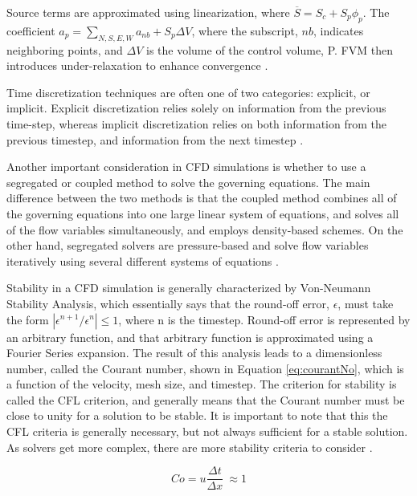\documentclass{UCF_ETD}
\begin{document}
Source terms are approximated using linearization, where $\overline{S}=S_c+S_p\phi_p$. The coefficient $a_p=\sum_{N,S,E,W}{a_{nb}+S_p\Delta V}$, where the subscript, $nb$, indicates neighboring points, and $\Delta V$ is the volume of the control volume, P. FVM then introduces under-relaxation to enhance convergence \cite{SIMPLEC}.

Time discretization techniques are often one of two categories: explicit, or implicit. Explicit discretization relies solely on information from the previous time-step, whereas implicit discretization relies on both information from the previous timestep, and information from the next timestep \cite{Anderson1995}.

Another important consideration in CFD simulations is whether to use a segregated or coupled method to solve the governing equations. The main difference between the two methods is that the coupled method combines all of the governing equations into one large linear system of equations, and solves all of the flow variables simultaneously, and employs density-based schemes. On the other hand, segregated solvers are pressure-based and solve flow variables iteratively using several different systems of equations \cite{ransom_1996}.

Stability in a CFD simulation is generally characterized by Von-Neumann Stability Analysis, which essentially says that the round-off error, $\epsilon$, must take the form $|\epsilon^{n+1} / \epsilon^{n}| \leq 1$, where n is the timestep.  Round-off error is represented by an arbitrary function, and that arbitrary function is approximated using a Fourier Series expansion. The result of this analysis leads to a dimensionless number, called the Courant number, shown in Equation \ref{eq:courantNo}, which is a function of the velocity, mesh size, and timestep. The criterion for stability is called the \ac{CFL} criterion, and generally means that the Courant number must be close to unity for a solution to be stable. It is important to note that this the \ac{CFL} criteria is generally necessary, but not always sufficient for a stable solution. As solvers get more complex, there are more stability criteria to consider \cite{Anderson1995}.

\begin{equation}
    Co=u\frac{\Delta t}{\Delta x}\ \approx 1
    \label{eq:courantNo}
\end{equation}
\end{document}
